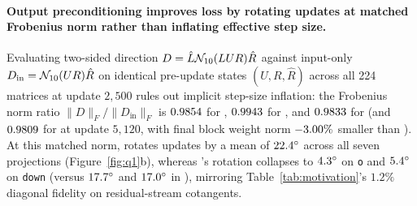 \paragraph{Output preconditioning improves loss by rotating updates at matched Frobenius norm rather than inflating effective step size.}
Evaluating two-sided direction $D = \hat L \mathcal{N}_{10}(L U R)\hat R$ against
input-only $D_{\text{in}} = \mathcal{N}_{10}(U R)\hat R$ on identical pre-update states
$(U, R, \hat R)$ across all 224 matrices at update $2{,}500$ rules out implicit
step-size inflation: the Frobenius norm ratio $\|D\|_F / \|D_{\text{in}}\|_F$ is
$0.9854{}$ for , $0.9943{}$ for
, and $0.9833{}$ for  (and
$0.9809{}$ for  at update $5{,}120$, with final
block weight norm $-3.00\%$ smaller than ).
At this matched norm,  rotates updates by a mean of
$22.4^\circ$ across all seven projections
(Figure~\ref{fig:q1}b), whereas 's rotation collapses to
$4.3^\circ$ on \texttt{o} and $5.4^\circ$
on \texttt{down} (versus $17.7^\circ$ and
$17.0^\circ$ in ), mirroring
Table~\ref{tab:motivation}'s $1.2\%$ diagonal fidelity on residual-stream
cotangents.

\begin{table}[t]
\centering
\caption{Core seed-0 geometry ablations, matched execution-path nulls, and
matched eight-A100 costs across all six taxonomic families ($130\text{M}$
$1\times$ Chinchilla, $2.68\text{B}$ tokens, $\eta=0.0226$ except 
at $0.016$; negative loss deltas favor the candidate). \textbf{Raw $\Delta$Sel}
and \textbf{$\Delta$C4} average the 11 second-half evaluations
($\text{step} > 2{,}560$); \textbf{$\Delta$Train $\pm$ SE} is the
autocorrelation-inflated paired per-update training difference over the final
$1{,}024$ updates ($536.9\text{M}$ tokens). \textbf{Net $\Delta$Sel} subtracts
each family's matched null (, , or same-wave
 ${}^{\dagger}$; ${}^{\S}$ uses conservative ).
Rows marked ${}^{\ddagger}$ are executed on uncontended \texttt{fast\_lag}
nodes paired against same-wave . \textbf{Mean Step \%} and
\textbf{Peak GiB} come from the unified 96-update \texttt{bench\_8gpu\_opt}
benchmark (mean of updates 37--96 relative to ; full-run timings
appear in Tables~\ref{tab:confirmation} and~\ref{tab:systems-v2}).}
\label{tab:main}
\scriptsize\setlength{\tabcolsep}{3.8pt}
\resizebox{\textwidth}{!}{}
\end{table}

